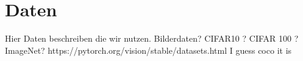 \section{Daten}
Hier Daten beschreiben die wir nutzen.
Bilderdaten?
CIFAR10 ? CIFAR 100 ? ImageNet? 
https://pytorch.org/vision/stable/datasets.html
I guess coco it is
